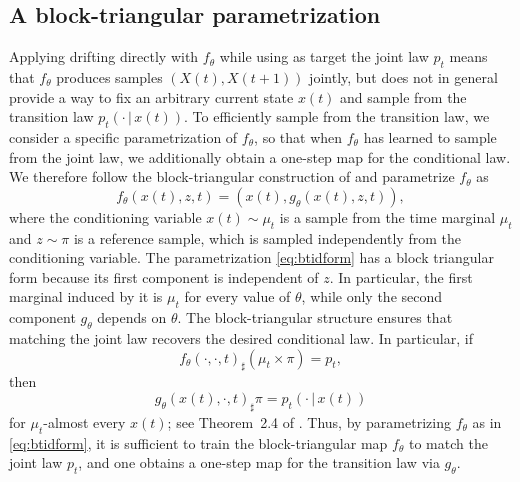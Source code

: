 \documentclass[10pt,a4paper]{amsart}
\begin{document}
\subsection{A block-triangular parametrization}
Applying drifting directly with $f_{\theta}$ while using as target the joint law $p_t$ means that  $f_{\theta}$ produces samples $(X(t),X(t+1))$ jointly, but does not in
    general provide a way to fix an arbitrary current state $x(t)$ and sample
    from the transition law $p_t(\cdot\,|\,x(t))$.
To efficiently sample from the transition law, we consider a specific parametrization of $f_{\theta}$, so that when $f_{\theta}$ has learned to sample from the joint law, we additionally obtain a one-step map for the conditional law.
We therefore follow the block-triangular construction of
\cite{baptista2024conditional} and parametrize $f_{\theta}$ as
    \begin{equation}\label{eq:btidform}
        f_\theta(x(t),z,t)
        =
        \left(
        x(t),
        g_\theta(x(t),z,t)
        \right),
    \end{equation}
    where the conditioning variable $x(t)\sim\mu_t$ is a sample from the time marginal $\mu_t$ and $z\sim\pi$ is a reference sample, which is sampled independently from the conditioning variable.
The parametrization \eqref{eq:btidform}  has a  block triangular form because its first component is independent of $z$. In particular, the first marginal induced by it is $\mu_t$ for every value of $\theta$, while only the second component
    $g_\theta$ depends on $\theta$.
The block-triangular structure ensures that matching the joint law recovers the desired conditional law. In particular,
    if
    \[
        f_\theta(\cdot,\cdot,t)_{\sharp}(\mu_t\times\pi)
        =
        p_t,
    \]
    then
    \[
        g_\theta(x(t),\cdot,t)_{\sharp}\pi
        =
        p_t(\cdot\,|\,x(t))
    \]
    for $\mu_t$-almost every $x(t)$; see Theorem~2.4 of
    \cite{baptista2024conditional}.
Thus, by parametrizing $f_{\theta}$ as in  \eqref{eq:btidform}, it is
    sufficient to train the block-triangular map $f_\theta$ to match the joint
    law $p_t$, and one obtains a one-step map for the transition law via $g_{\theta}$.
\end{document}
